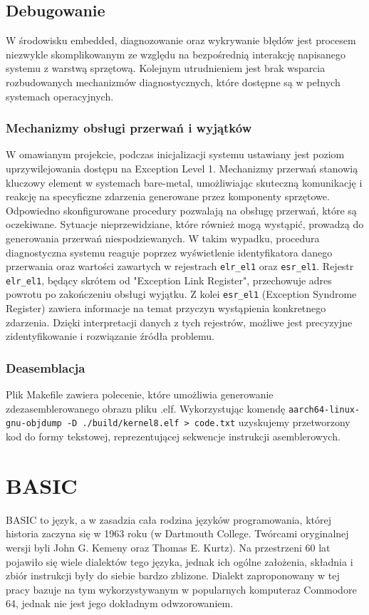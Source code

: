 \documentclass[shortabstract]{iithesis}
\begin{document}
\section{Debugowanie}
W środowisku embedded, diagnozowanie oraz wykrywanie błędów jest procesem niezwykle skomplikowanym ze względu na bezpośrednią interakcję napisanego systemu z warstwą sprzętową. Kolejnym utrudnieniem jest brak wsparcia rozbudowanych mechanizmów diagnostycznych, które dostępne są w pełnych systemach operacyjnych. 
\subsection{Mechanizmy obsługi przerwań i wyjątków}
W omawianym projekcie, podczas inicjalizacji systemu ustawiany jest poziom uprzywilejowania dostępu na Exception Level 1. Mechanizmy przerwań stanowią kluczowy element w systemach bare-metal, umożliwiając skuteczną komunikację i reakcję na specyficzne zdarzenia generowane przez komponenty sprzętowe. Odpowiedno skonfigurowane procedury pozwalają na obsługę przerwań, które są oczekiwane. 
Sytuacje nieprzewidziane, które również mogą wystąpić, prowadzą do generowania przerwań niespodziewanych. W takim wypadku, procedura diagnostyczna systemu reaguje poprzez wyświetlenie identyfikatora danego przerwania oraz wartości zawartych w rejestrach \texttt{elr\_el1} oraz \texttt{esr\_el1}. Rejestr \texttt{elr\_el1}, będący skrótem od "Exception Link Register", przechowuje adres powrotu po zakończeniu obsługi wyjątku. Z kolei \texttt{esr\_el1} (Exception Syndrome Register) zawiera informacje na temat przyczyn wystąpienia konkretnego zdarzenia. Dzięki interpretacji danych z tych rejestrów, możliwe jest precyzyjne zidentyfikowanie i rozwiązanie źródła problemu.
\subsection{Deasemblacja}
Plik Makefile zawiera polecenie, które umożliwia generowanie zdezasemblerowanego obrazu pliku .elf. Wykorzystując komendę \texttt{aarch64-linux-gnu-objdump -D ./build/kernel8.elf > code.txt} uzyskujemy przetworzony kod do formy tekstowej, reprezentującej sekwencje instrukcji asemblerowych.


\chapter{BASIC}
BASIC to język, a w zasadzia cała rodzina języków programowania, której historia zaczyna się w 1963 roku (w Dartmouth College. Twórcami oryginalnej wersji byli John G. Kemeny oraz Thomas E. Kurtz). Na przestrzeni 60 lat pojawiło się wiele dialektów tego języka, jednak ich ogólne założenia, składnia i zbiór instrukcji były do siebie bardzo zblizone. Dialekt zaproponowany w tej pracy bazuje na tym wykorzystywanym w popularnych komputeraz Commodore 64, jednak nie jest jego dokładnym odwzorowaniem.
\end{document}
